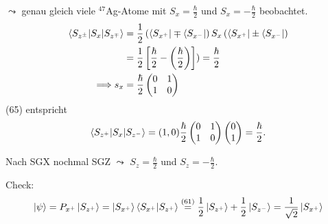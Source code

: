\documentclass[a4paper]{scrartcl}
\begin{document}
{\begin{aaufz}
$\leadsto$ genau gleich viele $^{47}$Ag-Atome mit $S_x = \frac \hbar 2$ und $S_x = - \frac \hbar 2$ beobachtet.
\begin{align}
\braket{ S_{z^{\pm}} | S_x | S_{z^\mp}} & = \frac12 \left( \bra{ S_{x^+}} \mp \bra{ S_{x^-}} \right) S_x \left( \bra{ S_{x^+}} \pm \bra {S_{x^-}} \right) \notag \\
& = \frac12 \left[ \frac \hbar2 - \left( \frac \hbar2 \right) \right] ) = \frac \hbar 2 \\
\Longrightarrow s_x & = \frac \hbar 2 \begin{pmatrix} 0 & 1 \\ 1 & 0 \end{pmatrix} 
\end{align}
(65) entspricht
$$\braket{ S_{z^+} | S_x | S_{z^-}} = (1, 0) \frac\hbar2 \begin{pmatrix} 0 & 1 \\ 1 & 0 \end{pmatrix} \begin{pmatrix} 0 \\1 \end{pmatrix} = \frac \hbar 2.$$
\item Nach SGX nochmal SGZ $\leadsto$ $S_z = \frac\hbar2$ und $S_z = - \frac\hbar2$.

Check:
$$ \ket \psi = P_{x^+} \ket{ S_{z^+}} = \ket {S_{x^+}} \braket{ S_{x^+} | S_{z^+}} \stackrel{(61)}= \frac12 \ket{ S_{z^+}} + \frac12 \ket{ S_{z^-}} = \frac1{\sqrt 2} \ket{S_{x^+}}$$


\end{aaufz}}
\end{document}
